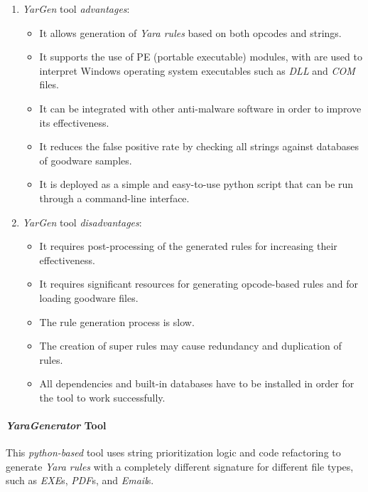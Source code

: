 \documentclass[pdfa%
,cucitura%
]{toptesi}
\begin{document}
\begin{enumerate}
	\item \textit{YarGen} tool \textit{advantages}:
	\begin{itemize}
		\item It allows generation of \textit{Yara rules} based on both opcodes and strings.
		
		\item It supports the use of PE (portable executable) modules, with are used to interpret Windows operating system executables such as \textit{DLL} and \textit{COM} files.
		
		\item It can be integrated with other anti-malware software in order to improve its effectiveness.
		
		\item It reduces the false positive rate by checking all strings against databases of goodware samples.
		
		\item It is deployed as a simple and easy-to-use python script that can be run through a command-line interface.
	\end{itemize}
	
	\item \textit{YarGen} tool \textit{disadvantages}:
	\begin{itemize}
		\item It requires post-processing of the generated rules for increasing their effectiveness.
		
		\item It requires significant resources for generating opcode-based rules and for loading goodware files.
		
		\item The rule generation process is slow.
		
		\item The creation of super rules may cause redundancy and duplication of rules.
		
		\item All dependencies and built-in databases have to be installed in order for the tool to work successfully.
	\end{itemize}
\end{enumerate}

\paragraph{\textit{YaraGenerator} Tool}
This \textit{python-based} tool uses string prioritization logic and code refactoring to generate \textit{Yara rules} with a completely different signature for different file types, such as \textit{EXE}s, \textit{PDF}s, and \textit{Email}s.
\end{document}
